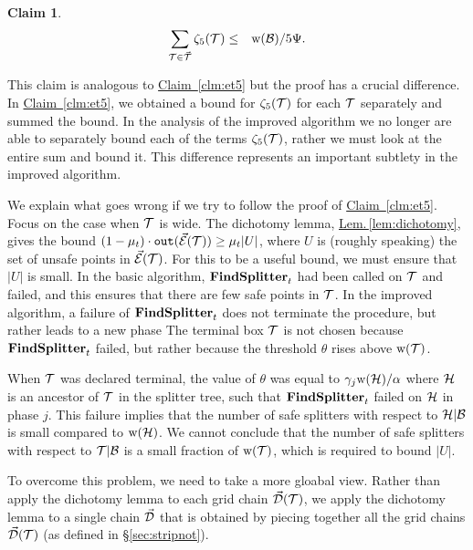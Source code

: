 \documentclass{acmsmall}
\newtheorem{claim}[theorem]{Claim}
\newcommand{\cB}{{\cal B}}
\newcommand{\cD}{{\cal D}}
\newcommand{\cE}{{\cal E}}
\newcommand{\cH}{{\cal H}}
\newcommand{\cT}{{\cal T}}
\newcommand{\Sec}[1]{\hyperref[sec:#1]{\S\ref*{sec:#1}}} %
\newcommand{\Lem}[1]{\hyperref[lem:#1]{Lem.\,\ref*{lem:#1}}} %
\newcommand{\Clm}[1]{\hyperref[clm:#1]{Claim~\ref*{clm:#1}}} %
\newcommand{\outside}{{\tt out}}
\newcommand{\strip}[2]{#1|#2}
\newcommand{\width}{{\bf {\rm  w}}}
\newcommand{\gridprec}{\alpha}
\newcommand{\errorcont}{\Psi}
\newcommand{\errorterm}{\zeta}
\newcommand{\findsplitter}{{\rm {\bf FindSplitter}}}
\begin{document}
\begin{claim} \label{clm:et5i}
\begin{eqnarray*}
\sum_{\cT \in \vec{\cT}} \errorterm_5(\cT) & \leq & \width(\cB)/5\errorcont.
\end{eqnarray*}
\end{claim}

This claim is analogous to \Clm{et5} but the proof has a crucial difference.
In \Clm{et5}, we obtained a bound for $\errorterm_5(\cT)$ for each $\cT$ separately and summed the bound.  In the analysis of the improved algorithm we no longer are able to separately bound each of the terms $\errorterm_5(\cT)$, rather we must
look at the entire sum and bound it.   This difference represents an important subtlety in the improved algorithm.

We explain what goes wrong if we try to follow the proof of \Clm{et5}.
Focus on the case when $\cT$ is wide.
The dichotomy lemma, \Lem{dichotomy}, gives the bound $(1-\mu_t)\cdot \outside(\vec{\cE}(\cT)) \geq \mu_t|U|$, where $U$ is (roughly speaking) the set of unsafe points in  $\vec{\cE}(\cT)$.
For this to be a useful bound, we must ensure that $|U|$ is small.
In the basic algorithm, $\findsplitter_t$ had been called on $\cT$ and failed, and this
ensures that there are few safe points in $\cT$.
In the improved algorithm, a failure of $\findsplitter_t$ does not terminate the procedure, but rather 
leads to a new phase
The terminal box $\cT$ is  not chosen
because $\findsplitter_t$ failed, but rather
because the threshold $\theta$ rises above $\width(\cT)$.   
 
When $\cT$ was declared terminal, the value of $\theta$ was equal to $\gamma_j \width(\cH)/\gridprec$ where $\cH$ is an
ancestor of $\cT$ in the splitter tree, such that $\findsplitter_t$ failed on $\cH$ in phase $j$.
This failure implies that the number of safe splitters with respect to 
$\strip{\cH}{\cB}$ is small compared to $\width(\cH)$. We cannot conclude that the number of safe
splitters with respect to $\strip{\cT}{\cB}$ is a small fraction of $\width(\cT)$, which is required
to bound $|U|$.
%

To overcome this problem, we need to take a more gloabal view.  Rather than
apply the dichotomy lemma to  each grid chain $\vec{\cD}(\cT)$, we   apply the dichotomy lemma 
to a single chain $\vec{\cD}$ that is obtained by piecing together all the grid chains $\vec{\cD}(\cT)$ (as defined in \Sec{stripnot}). 
\end{document}
